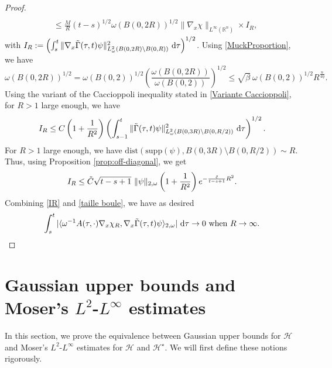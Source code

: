 \documentclass[12pt, letterpaper]{amsart}
\theoremstyle{definition}
\theoremstyle{remark}
\numberwithin{equation}{section}
\begin{document}
\begin{proof}
\begin{align*}
    \\& \leq \frac{M}{R} (t-s)^{1/2} \omega(B(0,2R))^{1/2}  \|  \nabla_x \chi \|_{L^\infty(\mathbb{R}^n)} \times I_R,
\end{align*}
with $I_R:=\left ( \int_{s}^{t}   \| \nabla_x \Tilde{\Gamma}(\tau,t)\psi \|^2_{L^2_\omega(B(0,2R)\setminus B(0,R))} \  \mathrm d \tau \right )^{1/2}$. Using \eqref{MuckProportion}, we have 
\begin{equation}\label{taille boule}
    \omega(B(0,2R))^{1/2}= \omega(B(0,2))^{1/2} \left ( \frac{\omega(B(0,2R))}{\omega(B(0,2))} \right )^{1/2} \leq \sqrt{\beta}\  \omega(B(0,2))^{1/2} R^{\frac{n}{4\eta}}.
\end{equation}
Using the variant of the Caccioppoli inequality stated in \eqref{Variante Caccioppoli}, for $R>1$ large enough, we have 
$$I_R \leq C  \left(1+\frac{1}{R^2} \right ) \left ( \int_{s-1}^{t}   \|  \Tilde{\Gamma}(\tau,t)\psi \|^2_{L^2_\omega(B(0,3R)\setminus B(0,R/2))} \  \mathrm d \tau \right )^{1/2}. $$
For $R>1$ large enough, we have $\mathrm{dist}(\mathrm{supp}(\psi),B(0,3R)\setminus B(0,R/2)) \sim R$. Thus, using Proposition \ref{prop:off-diagonal}, we get
\begin{equation}\label{IR}
    I_R \leq \Tilde{C} \sqrt{t-s+1} \ \|  \psi \|_{2,\omega} \left(1+\frac{1}{R^2} \right ) e^{-\frac{\Tilde{c}}{t-s+1}R^2}.
\end{equation}
Combining \eqref{IR} and \eqref{taille boule}, we have as desired
$$\int_{s}^{t} |\langle \omega ^{-1} A(\tau,\cdot) \nabla_x \chi_{R}, \nabla_x \Tilde{\Gamma}(\tau,t)\psi \rangle_{2,\omega} | \  \mathrm d \tau \to 0 \ \text{when} \ R \to \infty.$$
\end{proof}

\section{Gaussian upper bounds and Moser’s \texorpdfstring{$L^2$}{L2}-\texorpdfstring{$L^\infty$}{} estimates}\label{section 4}
In this section, we prove the equivalence between Gaussian upper bounds for $\mathcal{H}$ and Moser’s $L^2$-$L^\infty$ estimates for $\mathcal{H}$ and $\mathcal{H}^\star $. We will first define these notions rigorously.
\end{document}

